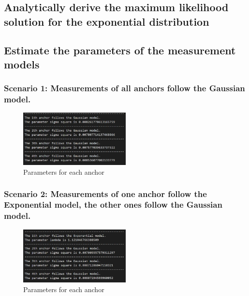 \documentclass[a4paper]{article}
\begin{document}
\subsection{Analytically derive the maximum likelihood solution for the exponential distribution}

\subsection{Estimate the parameters of the measurement models}
\subsubsection{Scenario 1: Measurements of all anchors follow the Gaussian model.}
\begin{figure}[h]
	\begin{center}
		\includegraphics[width=0.5\textwidth]{scenario1param.jpg}
		\caption{Parameters for each anchor}
	\end{center}
\end{figure}
\clearpage
\subsubsection{Scenario 2: Measurements of one anchor follow the Exponential model, the other ones follow the Gaussian model.}
\begin{figure}[h]
	\begin{center}
		\includegraphics[width=0.5\textwidth]{scenario2param.jpg}
		\caption{Parameters for each anchor}
	\end{center}
\end{figure}
\end{document}
